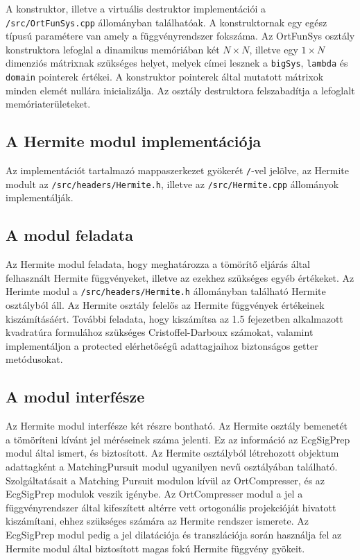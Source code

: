 \documentclass[oneside,titlepage,12pt,a4paper]{report}
\begin{document}
\par A konstruktor, illetve a virtuális destruktor implementációi a \texttt{/src/OrtFunSys.cpp} állományban találhatóak. A konstruktornak egy egész típusú paramétere van amely a függvényrendszer fokszáma. Az OrtFunSys osztály konstruktora lefoglal a dinamikus memóriában két $N\times N$, illetve egy $1\times N$ dimenziós mátrixnak szükséges helyet, melyek címei lesznek a \texttt{bigSys}, \texttt{lambda} és \texttt{domain} pointerek értékei. A konstruktor pointerek által mutatott mátrixok minden elemét nullára inicializálja. Az osztály destruktora felszabadítja a lefoglalt memóriaterületeket. 


\subsection{A Hermite modul implementációja} \label{subsec::hermimpl}

Az implementációt tartalmazó mappaszerkezet gyökerét \texttt{/}-vel jelölve, az Hermite modult  az \texttt{/src/headers/Hermite.h}, illetve az \texttt{/src/Hermite.cpp} állományok implementálják.

\subsection*{A modul feladata}

\par Az Hermite modul feladata, hogy meghatározza a tömörítő eljárás által felhasznált Hermite függvényeket, illetve az ezekhez szükséges egyéb értékeket. Az Herimte modul a \texttt{/src/headers/Hermite.h} állományban található Hermite osztályból áll. Az Hermite osztály felelős az Hermite függvények értékeinek kiszámításáért. További feladata, hogy kiszámítsa az 1.5 fejezetben alkalmazott kvadratúra formulához szükséges Cristoffel-Darboux számokat, valamint implementáljon a protected elérhetőségű adattagjaihoz biztonságos getter metódusokat.

\subsection*{A modul interfésze}

\par Az Hermite modul interfésze két részre bontható. Az Hermite osztály bemenetét a tömöríteni kívánt jel méréseinek száma jelenti. Ez az információ az EcgSigPrep modul által ismert, és biztosított. Az Hermite osztályból létrehozott objektum adattagként a MatchingPursuit modul ugyanilyen nevű osztályában található. Szolgáltatásait a Matching Pursuit modulon kívül az OrtCompresser, és az EcgSigPrep modulok veszik igénybe. Az OrtCompresser modul a jel a függvényrendszer által kifeszített altérre vett ortogonális projekcióját hivatott kiszámítani, ehhez szükséges számára az Hermite rendszer ismerete. Az EcgSigPrep modul pedig a jel dilatációja és transzlációja során használja fel az Hermite modul által biztosított magas fokú Hermite függvény gyökeit.   
\end{document}

